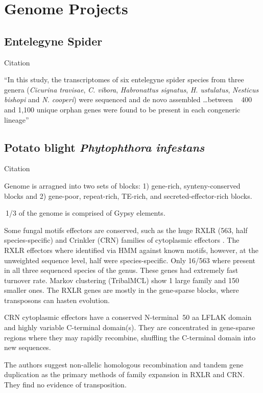 \section{Genome Projects}
\subsection{Entelegyne Spider}

  Citation \cite{carlson_novo_2015}

  ``In this study, the transcriptomes of six entelegyne spider species from
  three genera (\textit{Cicurina travisae}, \textit{C. vibora},
  \textit{Habronattus signatus}, \textit{H. ustulatus}, \textit{Nesticus
    bishopi} and \textit{N.  cooperi}) were sequenced and de novo assembled
  \dots between ~ 400 and 1,100 unique orphan genes were found to be present in
  each congeneric lineage''

\subsection{Potato blight \textit{Phytophthora infestans}}

  Citation \cite{haas_genome_2009}

  Genome is arragned into two sets of blocks: 1) gene-rich, synteny-conserved
  blocks and 2) gene-poor, repeat-rich, TE-rich, and secreted-effector-rich
  blocks.

  $~$1/3 of the genome is comprised of Gypsy elements.

  Some fungal motifs effectors are conserved, such as the huge RXLR (563, half
  species-specific) and Crinkler (CRN) families of cytoplasmic effectors
  \cite{haas_genome_2009}. The RXLR effectors where identified via HMM against
  known motifs, however, at the unweighted sequence level, half were
  species-specific. Only 16/563 where present in all three sequenced species of
  the genus. These genes had extremely fast turnover rate. Markov clustering
  (TribalMCL) show 1 large family and 150 smaller ones. The RXLR genes are
  mostly in the gene-sparse blocks, where transposons can hasten evolution.

  CRN cytoplasmic effectors have a conserved N-terminal $~$50 aa LFLAK domain
  and highly variable C-terminal domain(s). They are concentrated in
  gene-sparse regions where they may rapidly recombine, shuffling the
  C-terminal domain into new sequences.

  The authors suggest non-allelic homologous recombination and tandem gene
  duplication as the primary methods of family expansion in RXLR and CRN.  They
  find no evidence of transposition.

